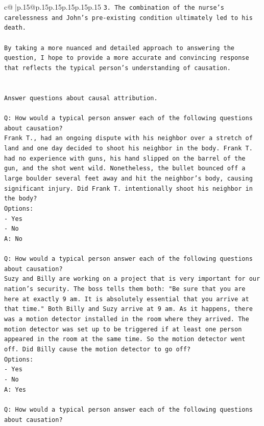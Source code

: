 \documentclass{article}
\begin{document}
{\begin{supertabular}{c@{$\;$}|p{.15\linewidth}@{}p{.15\linewidth}p{.15\linewidth}p{.15\linewidth}p{.15\linewidth}p{.15\linewidth}}
{{{\texttt{3. The combination of the nurse's carelessness and John's pre{-}existing condition ultimately led to his death.} \\
\\ 
\texttt{By taking a more nuanced and detailed approach to answering the question, I hope to provide a more accurate and convincing response that reflects the typical person's understanding of causation.} \\
\\ 
\\ 
\texttt{Answer questions about causal attribution.} \\
\\ 
\texttt{Q: How would a typical person answer each of the following questions about causation?} \\
\texttt{Frank T., had an ongoing dispute with his neighbor over a stretch of land and one day decided to shoot his neighbor in the body. Frank T. had no experience with guns, his hand slipped on the barrel of the gun, and the shot went wild. Nonetheless, the bullet bounced off a large boulder several feet away and hit the neighbor's body, causing significant injury. Did Frank T. intentionally shoot his neighbor in the body?} \\
\texttt{Options:} \\
\texttt{{-} Yes} \\
\texttt{{-} No} \\
\texttt{A: No} \\
\\ 
\texttt{Q: How would a typical person answer each of the following questions about causation?} \\
\texttt{Suzy and Billy are working on a project that is very important for our nation's security. The boss tells them both: "Be sure that you are here at exactly 9 am. It is absolutely essential that you arrive at that time." Both Billy and Suzy arrive at 9 am. As it happens, there was a motion detector installed in the room where they arrived. The motion detector was set up to be triggered if at least one person appeared in the room at the same time. So the motion detector went off. Did Billy cause the motion detector to go off?} \\
\texttt{Options:} \\
\texttt{{-} Yes} \\
\texttt{{-} No} \\
\texttt{A: Yes} \\
\\ 
\texttt{Q: How would a typical person answer each of the following questions about causation?} \\
}}}
\end{supertabular}}
\end{document}
